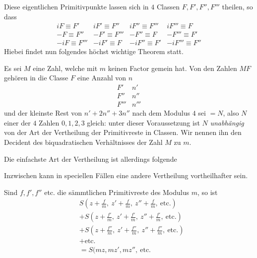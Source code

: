 Diese eigentlichen Primitivpunkte lassen sich in $4$ Classen $F,F',F'',F'''$ theilen, so dass
\[
\begin{array}{llll}
iF\equiv F'&iF'\equiv F''&iF''\equiv F'''&iF'''\equiv F\\
-F\equiv F''&-F'\equiv F'''&-F''\equiv F&-F'''\equiv F'\\
-iF\equiv F'''&-iF'\equiv F&-iF''\equiv F'&-iF'''\equiv F''
\end{array}
\]
Hiebei findet nun folgendes höchst wichtige Theorem statt.

Es sei $M$ eine Zahl, welche mit $m$ keinen Factor gemein hat. Von den Zahlen $MF$ gehören in die Classe $F$ eine Anzahl von $n$
\[
\begin{array}{cc}F'&n'\\F''&n''\\F'''&n'''\end{array}
\]
und der kleinste Rest von $n'+2n''+3n''$ nach dem Modulus $4$ sei $=N$, also $N$ einer der $4$ Zahlen $0,1,2,3$ gleich: unter dieser Voraussetzung ist $N$ \emph{unabhängig} von der Art der Vertheilung der Primitivreste in Classen. Wir nennen ihn den Decident des biquadratischen Verhältnisses der Zahl $M$ zu $m$.

Die einfachste Art der Vertheilung ist allerdings folgende
\begin{center}\resizebox{.35\textwidth}{!}{}\end{center}
Inzwischen kann in speciellen Fällen eine andere Vertheilung vortheilhafter sein.

Sind $f,f',f''$ etc. die sämmtlichen Primitivreste des Modulus $m$, so ist
\[
\begin{aligned}
&S(z+\tfrac fm,\ z'+\tfrac fm,\ z''+\tfrac fm,\ \text{etc.})\\
&+S(z+\tfrac{f'}m,\ z'+\tfrac{f'}m,\ z''+\tfrac{f'}m,\ \text{etc.})\\
&+S(z+\tfrac{f''}m,\ z'+\tfrac{f''}m,\ z''+\tfrac{f''}m,\ \text{etc.})\\
&+\text{etc.}\\
&=S(mz,mz',mz'',\ \text{etc.}
\end{aligned}
\]

